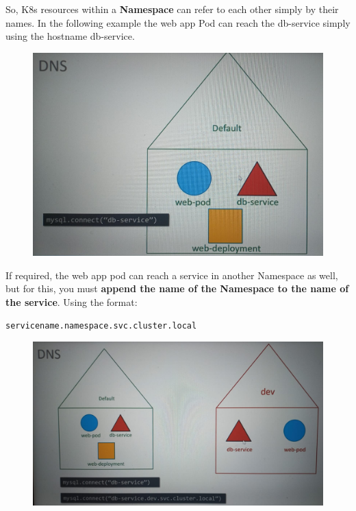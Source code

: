 \documentclass{article}
\newenvironment{codetemplate}[1][]{%
  \mybasecolorbox[#1]
  \itshape
}{%
  \endmybasecolorbox
}
\begin{document}
So, K8s resources within a \textbf{Namespace} can refer to each other simply by their names. In the following example the web app Pod can reach the db-service simply using the hostname db-service. 

\begin{figure}[H]
    \centering
    \includegraphics[scale=0.2]{pictures/namespace2.jpeg}
\end{figure}

If required, the web app pod can reach a service in another Namespace as well, but for this, you must \textbf{append the name of the Namespace to the name of the service}. Using the format:

\begin{codetemplate}{}
\begin{verbatim}
servicename.namespace.svc.cluster.local
\end{verbatim}
\end{codetemplate}

\begin{figure}[H]
    \centering
    \includegraphics[scale=0.22]{pictures/namespace3.jpeg}
\end{figure}
\end{document}
